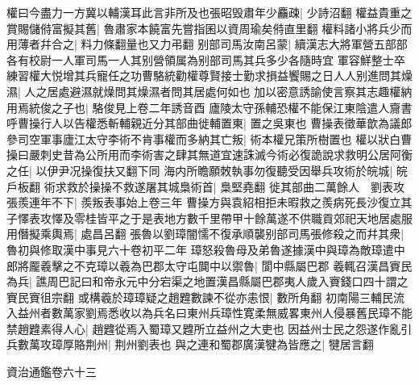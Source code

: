 權曰今盡力一方冀以輔漢耳此言非所及也張昭毁肅年少麤疎|{
	少詩沼翻}
權益貴重之賞賜儲偫富擬其舊|{
	魯肅家本饒富先嘗指囷以資周瑜矣偫直里翻}
權料諸小將兵少而用薄者幷合之|{
	料力條翻量也又力弔翻}
别部司馬汝南呂蒙|{
	續漢志大將軍營五部部各有校尉一人軍司馬一人其别營領属為别部司馬其兵多少各隨時宜}
軍容鮮整士卒練習權大悦增其兵寵任之功曹駱統勸權尊賢接士勤求損益饗賜之日人人别進問其燥濕|{
	人之居處避濕就燥問其燥濕者問其居處何如也}
加以密意誘諭使言察其志趣權納用焉統俊之子也|{
	駱俊見上卷二年誘音酉}
廬陵太守孫輔恐權不能保江東陰遣人齎書呼曹操行人以告權悉斬輔親近分其部曲徙輔置東|{
	置之吳東也}
曹操表徵華歆為議郎參司空軍事廬江太守李術不肯事權而多納其亡叛|{
	術本權兄策所樹置也}
權以狀白曹操曰嚴刺史昔為公所用而李術害之肆其無道宜速誅滅今術必復詭說求救明公居阿衡之任|{
	以伊尹况操復扶又翻下同}
海内所瞻願敇執事勿復聽受因舉兵攻術於皖城|{
	皖戶板翻}
術求救於操操不救遂屠其城梟術首|{
	梟堅堯翻}
徙其部曲二萬餘人　劉表攻張羨連年不下|{
	羨叛表事始上卷三年}
曹操方與袁紹相拒未暇救之羨病死長沙復立其子懌表攻懌及零桂皆平之于是表地方數千里帶甲十餘萬遂不供職貢郊祀天地居處服用僭擬乘輿焉|{
	處昌呂翻}
張魯以劉璋闇懦不復承順襲别部司馬張修殺之而幷其衆|{
	魯初與修取漢中事見六十卷初平二年}
璋怒殺魯母及弟魯遂據漢中與璋為敵璋遣中郎將龎羲擊之不克璋以羲為巴郡太守屯䦘中以禦魯|{
	閬中縣屬巴郡}
羲輒召漢昌賨民為兵|{
	譙周巴記曰和帝永元中分宕渠之地置漢昌縣屬巴郡夷人歲入賨錢口四十謂之賨民賨徂宗翻}
或構羲於璋璋疑之趙韙數諫不從亦恚恨|{
	數所角翻}
初南陽三輔民流入益州者數萬家劉焉悉收以為兵名曰東州兵璋性寛柔無威畧東州人侵暴舊民璋不能禁趙韙素得人心|{
	趙韙從焉入蜀璋又韙所立益州之大吏也}
因益州士民之怨遂作亂引兵數萬攻璋厚賂荆州|{
	荆州劉表也}
與之連和蜀郡廣漢犍為皆應之|{
	犍居言翻}


資治通鑑卷六十三

